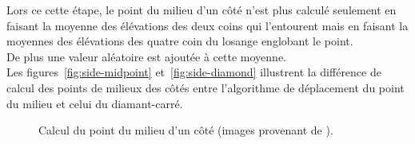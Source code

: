 Lors ce cette étape, le point du milieu d'un côté n'est plus calculé seulement
en faisant la moyenne des élévations des deux coins qui l'entourent mais en faisant
la moyennes des élévations des quatre coin du losange englobant le point.\\

De plus une valeur aléatoire est ajoutée à cette moyenne.\\

Les figures~\ref{fig:side-midpoint} et~\ref{fig:side-diamond} illustrent la différence de calcul des points de milieux
des côtés entre l'algorithme de déplacement du point du milieu et celui du
diamant-carré.

\begin{figure}[h]
  \centering
  \quad
  \caption{Calcul du point du milieu d'un côté (images provenant de
    \cite{FractalTerrainGeneration}).}
\end{figure}




